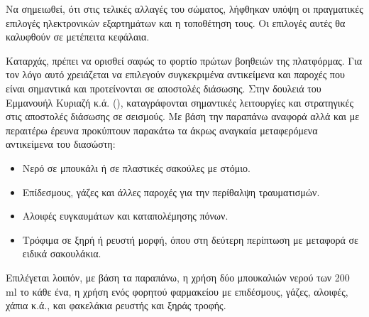 Να σημειωθεί, ότι στις τελικές αλλαγές του σώματος, λήφθηκαν υπόψη οι πραγματικές επιλογές ηλεκτρονικών εξαρτημάτων και η τοποθέτηση τους. Οι επιλογές αυτές θα καλυφθούν σε μετέπειτα κεφάλαια.
\par Καταρχάς, πρέπει να ορισθεί σαφώς το φορτίο πρώτων βοηθειών της πλατφόρμας. Για τον λόγο αυτό χρειάζεται να επιλεγούν συγκεκριμένα αντικείμενα και παροχές που είναι σημαντικά και προτείνονται σε αποστολές διάσωσης. Στην δουλειά του Εμμανουήλ Κυριαζή κ.ά. (\cite{operations}), καταγράφονται σημαντικές λειτουργίες και στρατηγικές στις αποστολές διάσωσης σε σεισμούς. Με βάση την παραπάνω αναφορά αλλά και με περαιτέρω έρευνα προκύπτουν παρακάτω τα άκρως αναγκαία μεταφερόμενα αντικείμενα του διασώστη:
\begin{itemize}
    \item Νερό σε μπουκάλι ή σε πλαστικές σακούλες με στόμιο.
    \item Επίδεσμους, γάζες και άλλες παροχές για την περίθαλψη τραυματισμών.
    \item Αλοιφές ευγκαυμάτων και καταπολέμησης πόνων.
    \item Τρόφιμα σε ξηρή ή ρευστή μορφή, όπου στη δεύτερη περίπτωση με μεταφορά σε ειδικά σακουλάκια.
\end{itemize} 
Επιλέγεται λοιπόν, με βάση τα παραπάνω, η χρήση δύο μπουκαλιών νερού των 200 ml το κάθε ένα, η χρήση ενός φορητού φαρμακείου με επιδέσμους, γάζες, αλοιφές, χάπια κ.ά., και φακελάκια ρευστής και ξηράς τροφής.

